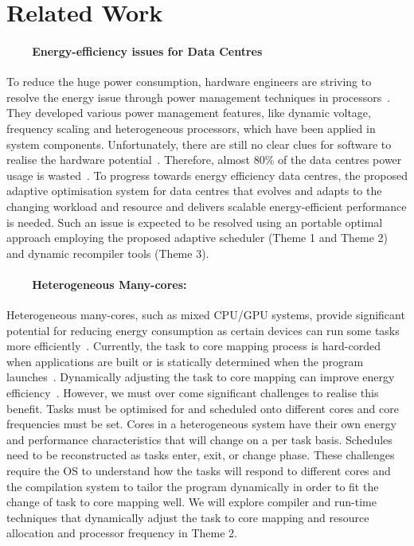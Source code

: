 \section{Related Work}
\paragraph{~~~~Energy-efficiency issues for Data Centres}
To reduce the huge power consumption, hardware engineers are striving to resolve the energy issue through power management techniques in processors~\cite{chanandopp}. They developed various power management features, like dynamic voltage, frequency scaling and heterogeneous processors, which have been applied in system components. Unfortunately, there are still no clear clues for software to realise the hardware potential~\cite{lookbackandfor,towardsenergyeff}. Therefore, almost 80\% of the data centres power usage is wasted~\cite{thecaseforepc}. To progress towards energy efficiency data centres, the proposed adaptive optimisation system for data centres that evolves and adapts to the changing workload and resource and delivers scalable energy-efficient performance is needed. Such an issue is expected to be resolved using an portable optimal approach employing the proposed adaptive scheduler (Theme 1 and Theme 2) and dynamic recompiler tools (Theme 3).


\paragraph{~~~~Heterogeneous Many-cores:} Heterogeneous many-cores, such as mixed CPU/GPU systems,
provide significant potential for
reducing energy consumption as certain devices can run some tasks more
efficiently~\cite{Cong:2012}. Currently, the task to core mapping process is
hard-corded when applications are built or is statically
determined when the program launches~\cite{cc11grewe}. Dynamically adjusting
the task to core mapping can improve energy efficiency~\cite{4550857}. However,
we must over come significant challenges to realise this benefit. Tasks must
be optimised for and scheduled onto different cores and core frequencies must
be set. Cores in a heterogeneous system have their own energy and performance
characteristics that will change on a per task basis. Schedules need to be
reconstructed as tasks enter, exit, or change phase. These challenges require
the OS to understand how the tasks will respond to different cores and the
compilation system to tailor the program dynamically in order to fit the
change of task to core mapping well. We will explore compiler and run-time
techniques that dynamically adjust the task to core mapping and resource
allocation and processor frequency in Theme 2.

